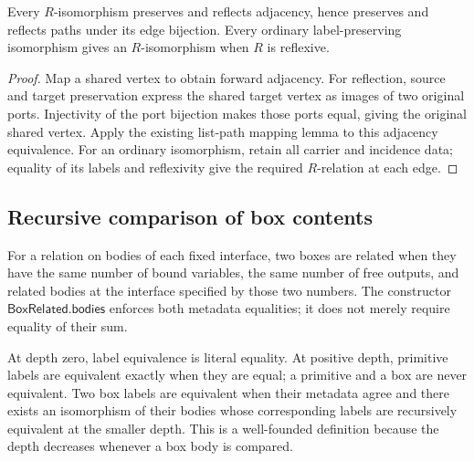 \begin{lemma}
Every $R$-isomorphism preserves and reflects adjacency, hence preserves and
reflects paths under its edge bijection. Every ordinary label-preserving
isomorphism gives an $R$-isomorphism when $R$ is reflexive.
\end{lemma}
\begin{proof}
Map a shared vertex to obtain forward adjacency. For reflection, source and
target preservation express the shared target vertex as images of two original
ports. Injectivity of the port bijection makes those ports equal, giving the
original shared vertex. Apply the existing list-path mapping lemma to this
adjacency equivalence. For an ordinary isomorphism, retain all carrier and
incidence data; equality of its labels and reflexivity give the required
$R$-relation at each edge.
\end{proof}

\subsection{Recursive comparison of box contents}

\begin{definition}\label{term:related-boxes}
For a relation on bodies of each fixed interface, two boxes are related when
they have the same number of bound variables, the same number of free outputs,
and related bodies at the interface specified by those two numbers. The
constructor $\mathsf{BoxRelated.bodies}$ enforces both metadata equalities; it
does not merely require equality of their sum.
\end{definition}

\begin{definition}\label{term:recursive-label-equivalence}
At depth zero, label equivalence is literal equality. At positive depth,
primitive labels are equivalent exactly when they are equal; a primitive and a
box are never equivalent. Two box labels are equivalent when their metadata
agree and there exists an isomorphism of their bodies whose corresponding
labels are recursively equivalent at the smaller depth. This is a well-founded
definition because the depth decreases whenever a box body is compared.
\end{definition}

